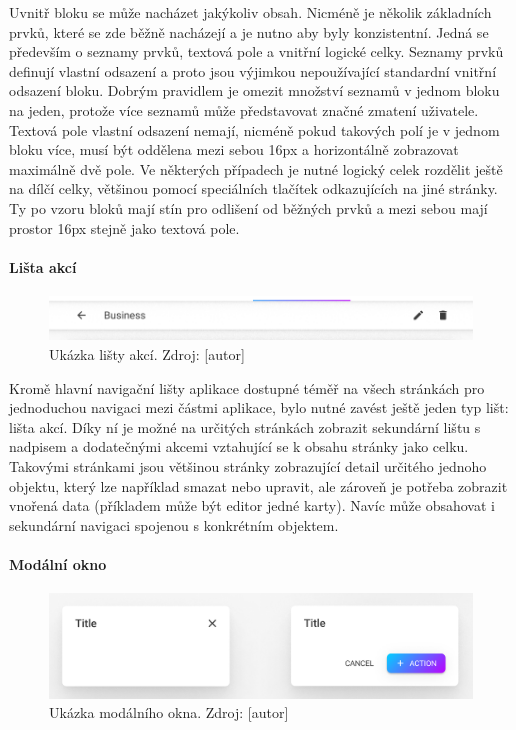 			Uvnitř bloku se může nacházet jakýkoliv obsah.
			Nicméně je několik základních prvků, které se zde běžně nacházejí a je nutno aby byly konzistentní.
			Jedná se především o seznamy prvků, textová pole a vnitřní logické celky.
			Seznamy prvků definují vlastní odsazení a proto jsou výjimkou nepoužívající standardní vnitřní odsazení
			bloku.
			Dobrým pravidlem je omezit množství seznamů v jednom bloku na jeden, protože více seznamů může představovat
			značné zmatení uživatele.
			Textová pole vlastní odsazení nemají, nicméně pokud takových polí je v jednom bloku více, musí být oddělena
			mezi sebou 16px a horizontálně zobrazovat maximálně dvě pole.
			Ve některých případech je nutné logický celek rozdělit ještě na dílčí celky, většinou pomocí speciálních
			tlačítek odkazujících na jiné stránky.
			Ty po vzoru bloků mají stín pro odlišení od běžných prvků a mezi sebou mají prostor 16px stejně jako
			textová pole.

			\paragraph{Lišta akcí}

			\begin{figure}[H]
				\centering
				\includegraphics[width=\linewidth]{obrazky/lista_akci}\hfill
				\caption{Ukázka lišty akcí. Zdroj: [autor]}
			\end{figure}

			Kromě hlavní navigační lišty aplikace dostupné téměř na všech stránkách pro jednoduchou navigaci mezi
			částmi aplikace, bylo nutné zavést ještě jeden typ lišt: lišta akcí.
			Díky ní je možné na určitých stránkách zobrazit sekundární lištu s nadpisem a dodatečnými akcemi vztahující
			se k obsahu stránky jako celku.
			Takovými stránkami jsou většinou stránky zobrazující detail určitého jednoho objektu, který lze například
			smazat nebo upravit, ale zároveň je potřeba zobrazit vnořená data (příkladem může být editor jedné karty).
			Navíc může obsahovat i sekundární navigaci spojenou s konkrétním objektem.

			\paragraph{Modální okno}

			\begin{figure}[H]
				\centering
				\includegraphics[width=\linewidth]{obrazky/modalni_okno}\hfill
				\caption{Ukázka modálního okna. Zdroj: [autor]}
			\end{figure}


